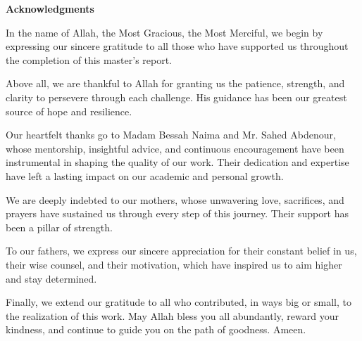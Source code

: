 \begin{center}
    {%
        \Large\bfseries
        Acknowledgments
    }
\end{center}

\noindent
In the name of Allah, the Most Gracious, the Most Merciful, we begin by expressing our sincere gratitude to all those who have supported us throughout the completion of this master’s report.

Above all, we are thankful to Allah for granting us the patience, strength, and clarity to persevere through each challenge. His guidance has been our greatest source of hope and resilience.

Our heartfelt thanks go to Madam Bessah Naima and Mr. Sahed Abdenour, whose mentorship, insightful advice, and continuous encouragement have been instrumental in shaping the quality of our work. Their dedication and expertise have left a lasting impact on our academic and personal growth.

We are deeply indebted to our mothers, whose unwavering love, sacrifices, and prayers have sustained us through every step of this journey. Their support has been a pillar of strength.

To our fathers, we express our sincere appreciation for their constant belief in us, their wise counsel, and their motivation, which have inspired us to aim higher and stay determined.

Finally, we extend our gratitude to all who contributed, in ways big or small, to the realization of this work. May Allah bless you all abundantly, reward your kindness, and continue to guide you on the path of goodness.
Ameen.